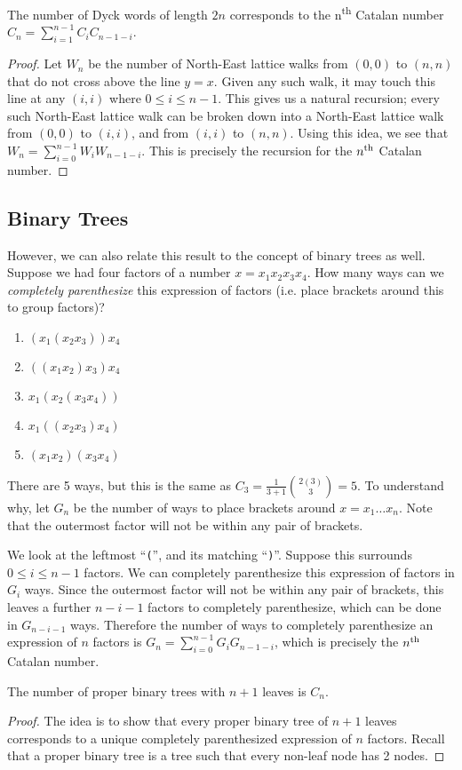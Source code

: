 \begin{theorem}
    The number of Dyck words of length $2n$ corresponds to the n\textsuperscript{th} Catalan number $C_{n}=\sum_{i=1}^{n-1}C_{i}C_{n-1-i}$.
\end{theorem}
\begin{proof}
    Let $W_{n}$ be the number of North-East lattice walks from $(0,0)$ to $(n,n)$ that do not cross above the line $y = x$. Given any such walk, it may touch this line at any $(i, i)$ where $0 \leq i \leq n-1$. This gives us a natural recursion; every such North-East lattice walk can be broken down into a North-East lattice walk from $(0, 0)$ to $(i, i)$, and from $(i, i)$ to $(n, n)$. Using this idea, we see that $W_{n}=\sum_{i=0}^{n-1}W_{i}W_{n-1-i}$. This is precisely the recursion for the $n\textsuperscript{th}$ Catalan number.
\end{proof}

\subsection{Binary Trees}
However, we can also relate this result to the concept of binary trees as well. Suppose we had four factors of a number $x = x_{1}x_{2}x_{3}x_{4}$. How many ways can we \textit{completely parenthesize} this expression of factors (i.e. place brackets around this to group factors)?
\begin{enumerate}
    \item $(x_{1}(x_{2}x_{3}))x_{4}$
    \item $((x_{1}x_{2})x_{3})x_{4}$
    \item $x_{1}(x_{2}(x_{3}x_{4}))$
    \item $x_{1}((x_{2}x_{3})x_{4})$
    \item $(x_{1}x_{2})(x_{3}x_{4})$
\end{enumerate}
There are 5 ways, but this is the same as $C_3 = \frac{1}{3+1} {2(3) \choose 3} = 5$. To understand why, let $G_{n}$ be the number of ways to place brackets around $x = x_{1}\dots x_{n}$. Note that the outermost factor will not be within any pair of brackets.

We look at the leftmost ``\texttt{(}'', and its matching ``\texttt{)}''. Suppose this surrounds $0 \leq i \leq n-1$ factors. We can completely parenthesize this expression of factors in $G_{i}$ ways. Since the outermost factor will not be within any pair of brackets, this leaves a further $n-i-1$ factors to completely parenthesize, which can be done in $G_{n-i-1}$ ways. Therefore the number of ways to completely parenthesize an expression of $n$ factors is ${G_{n}=\sum_{i=0}^{n-1}G_{i}G_{n-1-i}}$, which is precisely the $n\textsuperscript{th}$ Catalan number.
\begin{theorem}
    The number of proper binary trees with $n+1$ leaves is $C_n$.
\end{theorem}
\begin{proof}
    The idea is to show that every proper binary tree of $n+1$ leaves corresponds to a unique completely parenthesized expression of $n$ factors. Recall that a proper binary tree is a tree such that every non-leaf node has 2 nodes. 
\end{proof}